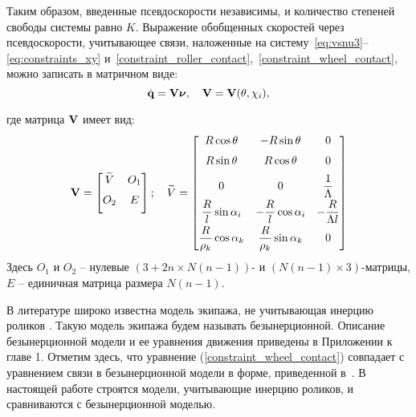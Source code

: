 Таким образом, введенные псевдоскорости независимы, и количество степеней свободы системы равно $K$. Выражение обобщенных скоростей через псевдоскорости, учитывающее связи, наложенные на систему~\eqref{eq:vsnu3}--\eqref{eq:constraints_xy} и~\eqref{constraint_roller_contact},~\eqref{constraint_wheel_contact}, можно записать в матричном виде:
\begin{equation}\label{constraints_V}
    \dot{\boldsymbol{\mathbf{q}}} = \mathbf{V}\boldsymbol{\mathbf{\nu}},\quad \mathbf{V} = \mathbf{V}(\theta,\chi_i),
\end{equation}

где матрица $\mathbf{V}$ имеет вид:
$$
\mathbf{V} = \begin{bmatrix}
        \widetilde{V}  & O_1  \\[6pt]
        O_2       & E         \\[6pt]
    \end{bmatrix};
\quad
\widetilde{V} = \begin{bmatrix}
        R\cos\theta                    & -R\sin\theta                    & 0                      \\[6pt]
        R\sin\theta                    &  R\cos\theta                    & 0                      \\[6pt]
        0                              & 0                               & \displaystyle\frac{\displaystyle 1}{\displaystyle \Lambda}    \\[6pt]
        \displaystyle\frac{\displaystyle R}{\displaystyle l}\sin\alpha_i      & -\displaystyle\frac{\displaystyle R}{\displaystyle l}\cos\alpha_i      & -\displaystyle\frac{\displaystyle R}{\displaystyle \Lambda l} \\[6pt]
        \displaystyle\frac{\displaystyle R}{\displaystyle \rho_k}\cos\alpha_k &  \displaystyle\frac{\displaystyle R}{\displaystyle \rho_k}\sin\alpha_k & 0                      \\[6pt]
    \end{bmatrix}
$$
Здесь $O_1$ и $O_2$ -- нулевые $(3+2n \times N(n-1))$- и $(N(n-1) \times 3)$-матрицы, $E$ -- единичная матрица размера $N(n-1)$.

\vspace{15pt}

В литературе широко известна модель экипажа, не учитывающая инерцию роликов \cite{ZobovaTatarinovAspecty2006,zobova2008svobodnye8020851,ZobovaTatarinovPMM,Zobova2011,MartynenkoFormalskii2007,formalskii,Martynenko2010_rus,Borisov2011,KilinBobykin2014}. Такую модель экипажа будем называть безынерционной. Описание безынерционной модели и ее уравнения движения приведены в Приложении к главе 1. Отметим здесь, что уравнение (\ref{constraint_wheel_contact}) совпадает с уравнением связи в безынерционной модели в форме, приведенной в~\cite{Zobova2011}. В настоящей работе строятся модели, учитывающие инерцию роликов, и сравниваются с безынерционной моделью.
